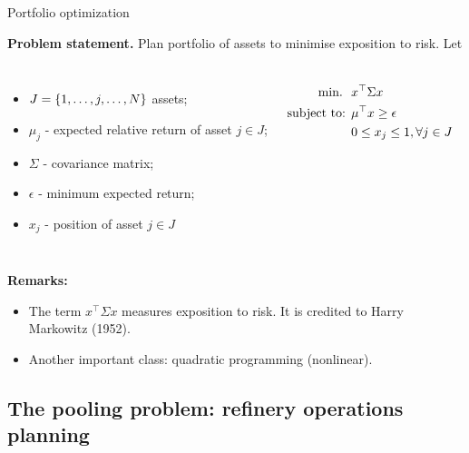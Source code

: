 \begin{frame}{Portfolio optimization}

	{\bf Problem statement.} Plan portfolio of assets to minimise exposition to risk. Let
	\begin{columns}
		\begin{itemize}
			\item {\small $J = \left\{ 1, \dots, j, \dots, N \right \}$} assets;
			\item $\mu_j$ - expected relative return of asset $j \in J$;
			\item $\Sigma$ - covariance matrix;
			\item $\epsilon$ - minimum expected return;
			\item $x_j$ - position of asset $j \in J$
		\end{itemize}
	
		\pause
		\begin{align*}
			\mathop{\text{min.} \ } \ &  x^\top\Sigma x  \\
			\mbox{subject to: } & \mu^\top x  \geq \epsilon\\
			& 0 \leq x_j \leq 1, \forall j \in J
		\end{align*} 
	\end{columns}
	\vfill
	\pause
	{\bf Remarks:} 
	\vspace{-6pt}
	\begin{itemize}
		\item The term $x^\top\Sigma x$ measures \alert{exposition to risk}. It is credited to Harry Markowitz (1952).
		\item Another important class: \alert{quadratic programming} (nonlinear).
	\end{itemize}

\end{frame}


\subsection{The pooling problem: refinery operations planning}


